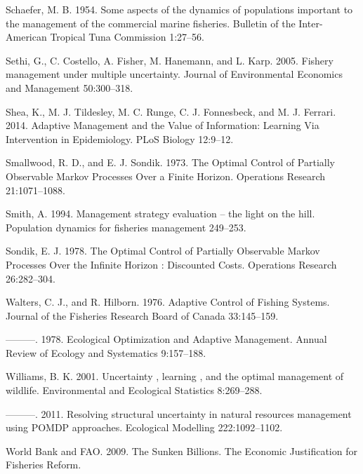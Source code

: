 \documentclass[3p]{elsarticle} %
\begin{document}
\leavevmode\hypertarget{ref-Schaefer1954}{}%
Schaefer, M. B. 1954. Some aspects of the dynamics of populations
important to the management of the commercial marine fisheries. Bulletin
of the Inter-American Tropical Tuna Commission 1:27--56.

\leavevmode\hypertarget{ref-Sethi2005}{}%
Sethi, G., C. Costello, A. Fisher, M. Hanemann, and L. Karp. 2005.
Fishery management under multiple uncertainty. Journal of Environmental
Economics and Management 50:300--318.

\leavevmode\hypertarget{ref-Shea2014}{}%
Shea, K., M. J. Tildesley, M. C. Runge, C. J. Fonnesbeck, and M. J.
Ferrari. 2014. Adaptive Management and the Value of Information:
Learning Via Intervention in Epidemiology. PLoS Biology 12:9--12.

\leavevmode\hypertarget{ref-Smallwood1973}{}%
Smallwood, R. D., and E. J. Sondik. 1973. The Optimal Control of
Partially Observable Markov Processes Over a Finite Horizon. Operations
Research 21:1071--1088.

\leavevmode\hypertarget{ref-Smith1994}{}%
Smith, A. 1994. Management strategy evaluation -- the light on the hill.
Population dynamics for fisheries management 249--253.

\leavevmode\hypertarget{ref-Sondik1978}{}%
Sondik, E. J. 1978. The Optimal Control of Partially Observable Markov
Processes Over the Infinite Horizon : Discounted Costs. Operations
Research 26:282--304.

\leavevmode\hypertarget{ref-Walters1976}{}%
Walters, C. J., and R. Hilborn. 1976. Adaptive Control of Fishing
Systems. Journal of the Fisheries Research Board of Canada 33:145--159.

\leavevmode\hypertarget{ref-Walters1978}{}%
---------. 1978. Ecological Optimization and Adaptive Management. Annual
Review of Ecology and Systematics 9:157--188.

\leavevmode\hypertarget{ref-Williams2001}{}%
Williams, B. K. 2001. Uncertainty , learning , and the optimal
management of wildlife. Environmental and Ecological Statistics
8:269--288.

\leavevmode\hypertarget{ref-Williams2011}{}%
---------. 2011. Resolving structural uncertainty in natural resources
management using POMDP approaches. Ecological Modelling 222:1092--1102.

\leavevmode\hypertarget{ref-FAO2009}{}%
World Bank and FAO. 2009. The Sunken Billions. The Economic
Justification for Fisheries Reform.
\end{document}
